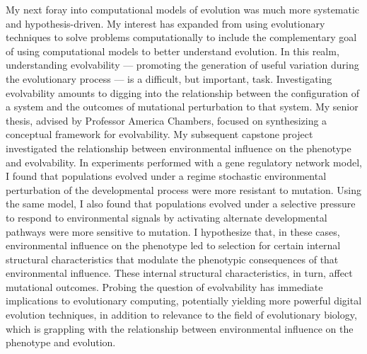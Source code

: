My next foray into computational models of evolution was much more systematic and hypothesis-driven.
My interest has expanded from using evolutionary techniques to solve problems computationally to include the complementary goal of using computational models to better understand evolution.
In this realm, understanding evolvability  ---  promoting the generation of useful variation during the evolutionary process  ---  is a difficult, but important, task.
Investigating evolvability amounts to digging into the relationship between the configuration of a system and the outcomes of mutational perturbation to that system.
My senior thesis, advised by Professor America Chambers, focused on synthesizing a conceptual framework for evolvability.
My subsequent capstone project investigated the relationship between environmental influence on the phenotype and evolvability.
In experiments performed with a gene regulatory network model, I found that populations evolved under a regime stochastic environmental perturbation of the developmental process were more resistant to mutation.
Using the same model, I also found that populations evolved under a selective pressure to respond to environmental signals by activating alternate developmental pathways were more sensitive to mutation.
I hypothesize that, in these cases, environmental influence on the phenotype led to selection for certain internal structural characteristics that modulate the phenotypic consequences of that environmental influence.
These internal structural characteristics, in turn, affect mutational outcomes.
Probing the question of evolvability has immediate implications to evolutionary computing, potentially yielding more powerful digital evolution techniques, in addition to relevance to the field of evolutionary biology, which is grappling with the relationship between environmental influence on the phenotype and evolution.
